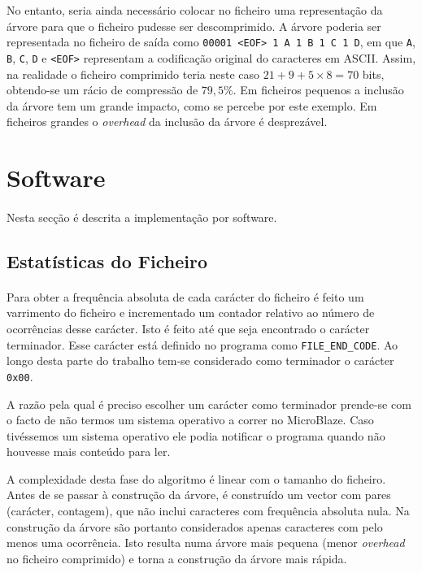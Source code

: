 \documentclass[a4paper]{article}
\begin{document}
	No entanto, seria ainda necessário colocar no ficheiro uma representação da árvore para que o ficheiro pudesse ser descomprimido. A árvore poderia ser representada no ficheiro de saída como \texttt{00001 <EOF> 1 A 1 B 1 C 1 D}, em que \texttt{A}, \texttt{B}, \texttt{C}, \texttt{D} e \texttt{<EOF>} representam a codificação original do caracteres em ASCII. Assim, na realidade o ficheiro comprimido teria neste caso $21 + 9 + 5 \times 8 = 70$ bits, obtendo-se um rácio de compressão de $79,5\%$. Em ficheiros pequenos a inclusão da árvore tem um grande impacto, como se percebe por este exemplo. Em ficheiros grandes o \textit{overhead} da inclusão da árvore é desprezável.

	\section{Software}

	\paragraph{} Nesta secção é descrita a implementação por software.

	\subsection{Estatísticas do Ficheiro}

	\paragraph{} Para obter a frequência absoluta de cada carácter do ficheiro é feito um varrimento do ficheiro e incrementado um contador relativo ao número de ocorrências desse carácter. Isto é feito até que seja encontrado o carácter terminador. Esse carácter está definido no programa como \texttt{FILE\_END\_CODE}. Ao longo desta parte do trabalho tem-se considerado como terminador o carácter \texttt{0x00}.

	A razão pela qual é preciso escolher um carácter como terminador prende-se com o facto de não termos um sistema operativo a correr no MicroBlaze. Caso tivéssemos um sistema operativo ele podia notificar o programa quando não houvesse mais conteúdo para ler.

	A complexidade desta fase do algoritmo é linear com o tamanho do ficheiro. Antes de se passar à construção da árvore, é construído um vector com pares (carácter, contagem), que não inclui caracteres com frequência absoluta nula. Na construção da árvore são portanto considerados apenas caracteres com pelo menos uma ocorrência. Isto resulta numa árvore mais pequena (menor \textit{overhead} no ficheiro comprimido) e torna a construção da árvore mais rápida.
\end{document}
